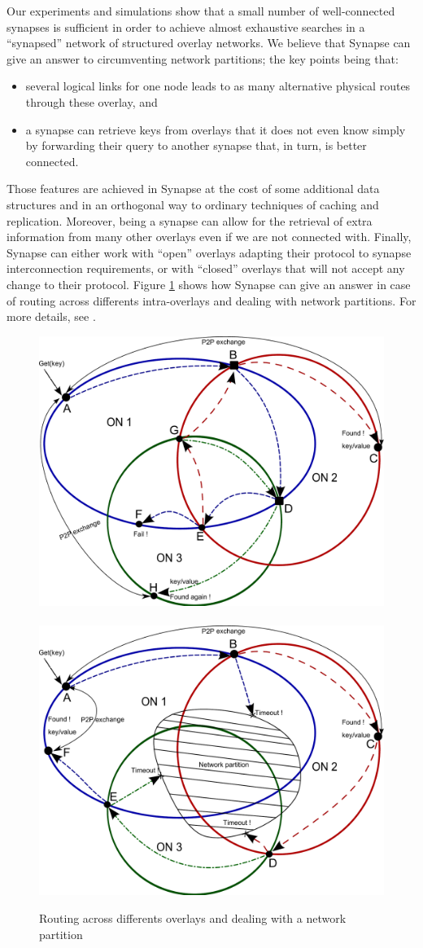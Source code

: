 Our experiments and simulations show that a small number of
well-connected synapses is sufficient in order to achieve almost
exhaustive searches in a ``synapsed'' network of structured overlay
networks. We believe that Synapse can give an answer to circumventing
network partitions; the key points being that:
   \begin{itemize}
   \item several logical links for one node leads to as many
     alternative physical routes through these overlay, and
   \item a synapse can retrieve keys from overlays that it does not
     even know simply by forwarding their query to another synapse
     that, in turn, is better connected.
 \end{itemize}
%
 Those features are achieved in Synapse at the cost of some additional
 data structures and in an orthogonal way to ordinary techniques of
 caching and replication. Moreover, being a synapse can allow for the
 retrieval of extra information from many other overlays even if we
 are not connected with.  Finally, Synapse can either work with
 ``open'' overlays adapting their protocol to synapse interconnection
 requirements, or with ``closed'' overlays that will not accept any
 change to their protocol. Figure \ref{fig:example} shows how Synapse
 can give an answer in case of routing across differents
 intra-overlays and dealing with network partitions. For more details,
 see \cite{LTVBCM09}.



\begin{figure}[!t]
  \centering
  \mbox{\includegraphics[width=0.4\columnwidth]{fig/GET_into_other_ON.pdf}\,\,
    \includegraphics[width=0.4\columnwidth]{fig/ON_with_network_partition.pdf}}
  \caption{Routing across differents overlays and dealing with a network partition\label{fig:example}}
\end{figure}